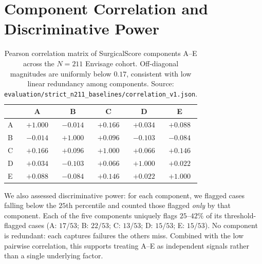 \documentclass{article}
\newcommand{\method}{Envisage}
\begin{document}
\section{Component Correlation and Discriminative Power}
\label{app:component_corr}

\begin{table}[h]
\centering
\small
\caption{Pearson correlation matrix of SurgicalScore components A--E across
the $N{=}211$ \method{} cohort. Off-diagonal magnitudes are uniformly
below $0.17$, consistent with low linear redundancy among components. Source:
\texttt{evaluation/strict\_n211\_baselines/correlation\_v1.json}.}
\label{tab:component_corr}
\begin{tabular}{@{}lccccc@{}}
\toprule
 & \textbf{A} & \textbf{B} & \textbf{C} & \textbf{D} & \textbf{E} \\
\midrule
A & $+1.000$ & $-0.014$ & $+0.166$ & $+0.034$ & $+0.088$ \\
B & $-0.014$ & $+1.000$ & $+0.096$ & $-0.103$ & $-0.084$ \\
C & $+0.166$ & $+0.096$ & $+1.000$ & $+0.066$ & $+0.146$ \\
D & $+0.034$ & $-0.103$ & $+0.066$ & $+1.000$ & $+0.022$ \\
E & $+0.088$ & $-0.084$ & $+0.146$ & $+0.022$ & $+1.000$ \\
\bottomrule
\end{tabular}
\end{table}

We also assessed discriminative power: for each component, we flagged cases
falling below the $25$th percentile and counted those flagged \emph{only}
by that component. Each of the five components uniquely flags
$25$--$42\%$ of its threshold-flagged cases (A: $17/53$; B: $22/53$;
C: $13/53$; D: $15/53$; E: $15/53$). No component is redundant: each
captures failures the others miss. Combined with the low pairwise
correlation, this supports treating A--E as independent signals rather
than a single underlying factor.


\end{document}

